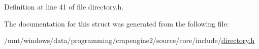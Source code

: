Definition at line 41 of file directory.\+h.



The documentation for this struct was generated from the following file\+:\begin{DoxyCompactItemize}
\item 
/mnt/windows/data/programming/crapengine2/source/core/include/\hyperlink{directory_8h}{directory.\+h}\end{DoxyCompactItemize}
